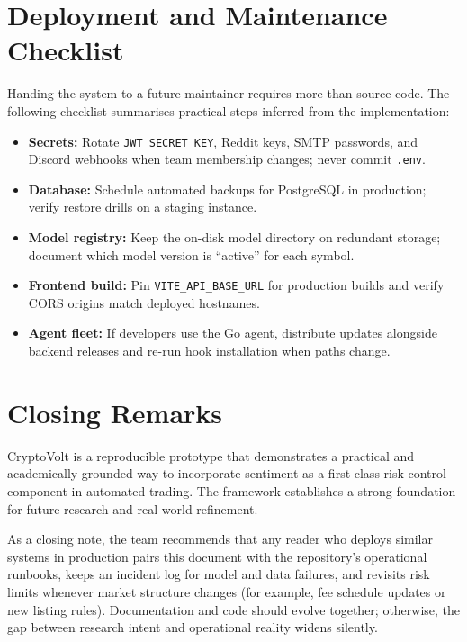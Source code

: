 \section{Deployment and Maintenance Checklist}
Handing the system to a future maintainer requires more than source code. The following checklist summarises practical steps inferred from the implementation:
\begin{itemize}
	\item \textbf{Secrets:} Rotate \texttt{JWT\_SECRET\_KEY}, Reddit keys, SMTP passwords, and Discord webhooks when team membership changes; never commit \texttt{.env}.
	\item \textbf{Database:} Schedule automated backups for PostgreSQL in production; verify restore drills on a staging instance.
	\item \textbf{Model registry:} Keep the on-disk model directory on redundant storage; document which model version is ``active'' for each symbol.
	\item \textbf{Frontend build:} Pin \texttt{VITE\_API\_BASE\_URL} for production builds and verify CORS origins match deployed hostnames.
	\item \textbf{Agent fleet:} If developers use the Go agent, distribute updates alongside backend releases and re-run hook installation when paths change.
\end{itemize}

\section{Closing Remarks}
CryptoVolt is a reproducible prototype that demonstrates a practical and academically grounded way to incorporate sentiment as a first-class risk control component in automated trading. The framework establishes a strong foundation for future research and real-world refinement.

As a closing note, the team recommends that any reader who deploys similar systems in production pairs this document with the repository's operational runbooks, keeps an incident log for model and data failures, and revisits risk limits whenever market structure changes (for example, fee schedule updates or new listing rules). Documentation and code should evolve together; otherwise, the gap between research intent and operational reality widens silently.